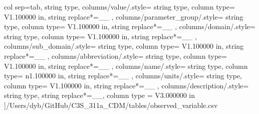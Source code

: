 \begin{landscape}
    col sep=tab,
    string type,
    columns/value/.style={
            string type, 
            column type= V{1.100000 in}, 
            string replace*={_}{\_}
        },
    columns/parameter_group/.style={
            string type, 
            column type= V{1.100000 in}, 
            string replace*={_}{\_}
        },
    columns/domain/.style={
            string type, 
            column type= V{1.100000 in}, 
            string replace*={_}{\_}
        },
    columns/sub_domain/.style={
            string type, 
            column type= V{1.100000 in}, 
            string replace*={_}{\_}
        },
    columns/abbreviation/.style={
            string type, 
            column type= V{1.100000 in}, 
            string replace*={_}{\_}
        },
    columns/name/.style={
            string type, 
            column type= n{1.100000 in}, 
            string replace*={_}{\_}
        },
    columns/units/.style={
            string type, 
            column type= V{1.100000 in}, 
            string replace*={_}{\_}
        },
    columns/description/.style={
            string type, 
            string replace*={_}{\_},
            column type = V{3.000000 in}
        }
    ]{/Users/dyb/GitHub/C3S_311a_CDM/tables/observed_variable.csv}
\end{landscape}
